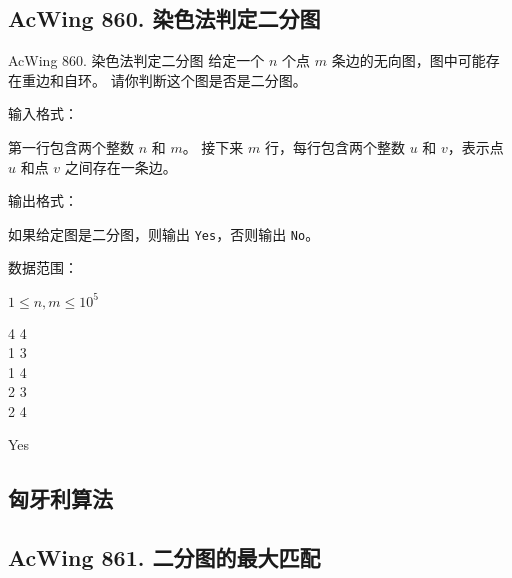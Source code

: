 \subsection{AcWing 860. 染色法判定二分图}
\begin{titledbox}{AcWing 860. 染色法判定二分图}
    给定一个 $n$ 个点 $m$ 条边的无向图，图中可能存在重边和自环。 请你判断这个图是否是二分图。

    输入格式：

    第一行包含两个整数 $n$ 和 $m$。 接下来 $m$ 行，每行包含两个整数 $u$ 和 $v$，表示点 $u$ 和点 $v$ 之间存在一条边。

    输出格式：

    如果给定图是二分图，则输出 \lstinline{Yes}，否则输出 \lstinline{No}。

    数据范围：

    $1 \le n,m \le 10^5$

    \begin{inputblock}
        4 4 \\
        1 3 \\
        1 4 \\
        2 3 \\
        2 4
    \end{inputblock}
    \begin{outputblock}
        Yes
    \end{outputblock}
\end{titledbox}

\subsection{匈牙利算法}

\subsection{AcWing 861. 二分图的最大匹配}

